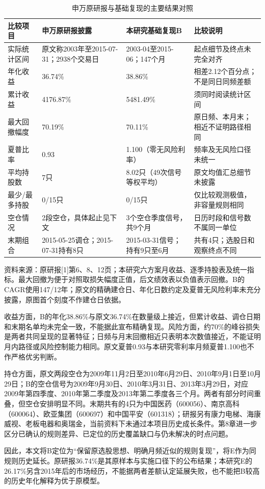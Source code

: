 \begin{table}[htbp]
\centering
\caption{申万原研报与基础复现的主要结果对照}
\renewcommand{\arraystretch}{1.18}
\small
\setlength{\tabcolsep}{4.5pt}
\begin{tabularx}{\textwidth}{@{}p{2.05cm}LLL@{}}
\toprule
比较项目 & 申万原研报披露 & 本研究基础复现B & 比较说明 \\
\midrule
实际统计区间 & 原文称2003年至2015-07-31；2938个交易日 & 2003-04至2015-06；147个月 & 起点细节及终点未完全对齐 \\
年化收益 & 36.74\% & 38.86\% & 相差2.12个百分点；不是同日同频差额 \\
累计收益 & 4176.87\% & 5481.49\% & 须同时阅读统计区间 \\
最大回撤幅度 & 70.19\% & 70.11\% & 原日频、本月末；相近不证明路径相同 \\
夏普比率 & 0.93 & 1.100（零无风险利率） & 频率及无风险口径未统一 \\
平均持股数 & 7只 & 8.02只（49次信号等权平均） & 原文均值汇总细节未披露 \\
最少/最多持股 & 0/15只 & 0/15只 & 仅比较观测极值，非容量规则相同 \\
空仓情况 & 2段空仓，具体起止见下文 & 3个空仓季度信号，共9个月 & 日历时段和信号数不属同一单位 \\
末期组合 & 2015-05-25调仓；2015-07-31持有8只 & 2015-03-31信号；持有9只至6月 & 共有4只；选股日和观察终点不同 \\
\bottomrule
\end{tabularx}
\par\smallskip
\begin{minipage}{\textwidth}\small 资料来源：原研报[1]第6、8、12页；本研究六方案月收益、逐季持股表及统一指标。最大回撤为便于对照取损失幅度正值，后文绩效表以负值表示回撤。B的CAGR使用147/12年；原文的精确建仓日、年化日数约定及夏普无风险利率未充分披露，原图首个刻度不作建仓日依据。\end{minipage}
\end{table}

收益方面，B的年化38.86\%与原文36.74\%在数量级上接近，但累计收益、调仓日期和末期名单均未完全一致，不能据此宣布精确复现。风险方面，约70\%的峰谷损失是两者共同呈现的显著特征；日频与月末回撤相近只表明本次数值接近，不能证明月内路径或风险控制能力相同。原文夏普0.93与本研究零利率月频夏普1.100也不作严格优劣判断。

持仓方面，原文两段空仓为2009年11月2日至2010年6月29日、2010年9月1日至10月29日；B的空仓信号为2009年9月30日、2010年3月31日、2013年3月29日，对应2009年第四季度、2010年第二季度及2013年第二季度各三个月。两者有部分时间重叠，但空仓安排明显不同。末期共有的4只为中国医药（600056）、南京高科（600064）、欧亚集团（600697）和中国平安（601318）；研报另有康力电梯、海康威视、老板电器和奥瑞金，当前资料下未通过本项目历史成长条件。第8章进一步区分已确认的规则差异、已定位的历史覆盖缺口与仍未解决的时点问题。

因此，本文将B定位为“保留原选股思想、明确月频近似的规则复现”，将E作为同规则历史延长。原研报36.74\%是其原样本与实施口径下的公布结果；本研究E的26.17\%另含2015年后的市场经历，不能据两者差额认定延展失败，也不能把B较高的历史年化解释为优于原模型。

